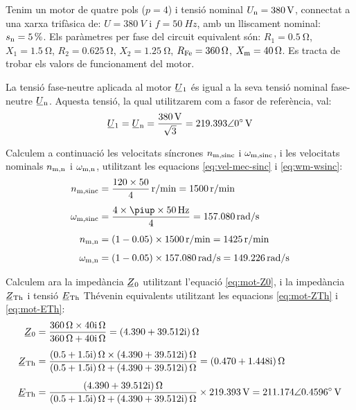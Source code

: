 \begin{exemple}\label{ex:CaractMotor}
	\addcontentsxms{\CaractMotor}	
    Tenim un motor de quatre pols ($p=4$) i tensió nominal $U_\mathrm{n}=\qty{380}{V}$, connectat a una xarxa trifàsica de: $U=\qty{380}{V}$ i $f=\qty{50}{Hz}$, amb un lliscament nominal: $s_\mathrm{n}=\qty{5}{\percent}$. Els paràmetres per fase del circuit equivalent són: $R_1=\qty{0,5}{\ohm}$, $X_1=\qty{1,5}{\ohm}$, $R_2=\qty{0,625}{\ohm}$, $X_2=\qty{1,25}{\ohm}$, $R_\mathrm{Fe}=\qty{360}{\ohm}$, $X_\mathrm{m}=\qty{40}{\ohm}$. Es tracta de trobar els valors de funcionament del motor.

    La tensió fase-neutre aplicada al motor $\cmplx{U}_1$ és igual a la seva tensió nominal  fase-neutre  $\cmplx{U}\ped{n}$. Aquesta tensió, la qual utilitzarem com a fasor de referència, val:
    \[
        \cmplx{U}_1 = \cmplx{U}\ped{n} = \frac{\qty{380}{V}}{\sqrt{3}} = \complexqty{219,393:0}{V}
    \]

    Calculem a continuació les velocitats síncrones $n_\mathrm{m,sinc}$ i $\omega_\mathrm{m,sinc}$, i les velocitats nominals $n_\mathrm{m,n}$ i $\omega_\mathrm{m,n}$, utilitzant les equacions \eqref{eq:vel-mec-sinc} i \eqref{eq:wm-wsinc}:
    \begin{align*}
        n\ped{m,sinc} &= \frac{120\times 50}{4} \, \unit{r/min} = \qty{1500}{r/min} \\[1ex]
        \omega\ped{m,sinc} &= \frac{4 \times\piup \times\qty{50}{Hz}}{4} =  \qty{157,080}{rad/s} \\[1ex]
        n\ped{m,n} &= (1-\num{0,05})\times \qty{1500}{r/min} = \qty{1425}{r/min} \\[1ex]
        \omega\ped{m,n} &= (1-\num{0,05}) \times\qty{157,080}{rad/s} = \qty{149,226}{rad/s}
    \end{align*}

    Calculem ara la impedància $\cmplx{Z}_0$ utilitzant l'equació \eqref{eq:mot-Z0}, i la impedància $\cmplx{Z}\ped{Th}$ i tensió $\cmplx{E}\ped{Th}$ Thévenin equivalents utilitzant les equacions \eqref{eq:mot-ZTh} i \eqref{eq:mot-ETh}:
     \begin{align*}
        \cmplx{Z}_0 &= \frac{\qty{360}{\ohm}\times\complexqty{j40}{\ohm}}{\qty{360}{\ohm}+\complexqty{j40}{\ohm}} = \complexqty{4,390+j39,512}{\ohm} \\[1ex]
        \cmplx{Z}\ped{Th} &= \frac{\complexqty{0,5+j1,5}{\ohm}\times\complexqty{4,390+j39,512}{\ohm}}
        {\complexqty{0,5+j1,5}{\ohm}+\complexqty{4,390+j39,512}{\ohm}} =  \complexqty{0,470+j1,448}{\ohm} \\[1ex]
        \cmplx{E}\ped{Th}  &= \frac{\complexqty{4,390+j39,512}{\ohm}}
        {\complexqty{0,5+j1,5}{\ohm}+\complexqty{4,390+j39,512}{\ohm}}\times\qty{219,393}{V} =  \complexqty{211,174:0,4596}{V}
    \end{align*}


\end{exemple}
